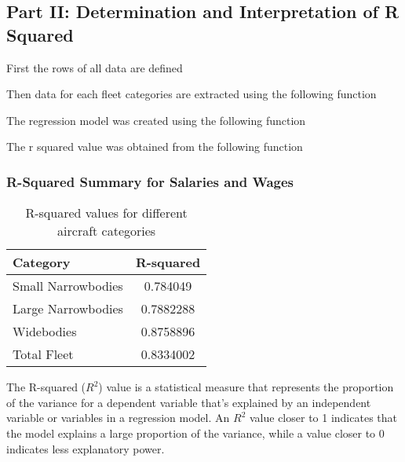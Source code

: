 \subsection{Part II: Determination and Interpretation of R Squared }

First the rows of all data are defined


Then data for each fleet categories are extracted using the following function


The regression model was created using the following function


The r squared value was obtained from the following function


\subsubsection*{R-Squared Summary for Salaries and Wages}
\begin{table}[htbp]
    \centering
    \begin{tabular}{lc}
        \toprule
        Category           & R-squared \\
        \midrule
        Small Narrowbodies & 0.784049  \\
        Large Narrowbodies & 0.7882288 \\
        Widebodies         & 0.8758896 \\
        Total Fleet        & 0.8334002 \\
        \bottomrule
    \end{tabular}
    \caption{R-squared values for different aircraft categories}
    \label{tab:rsquared}
\end{table}

The R-squared (\( R^2 \)) value is a statistical measure that represents the proportion of the variance for a dependent variable that's explained by an independent variable or variables in a regression model. An \( R^2 \) value closer to 1 indicates that the model explains a large proportion of the variance, while a value closer to 0 indicates less explanatory power.

